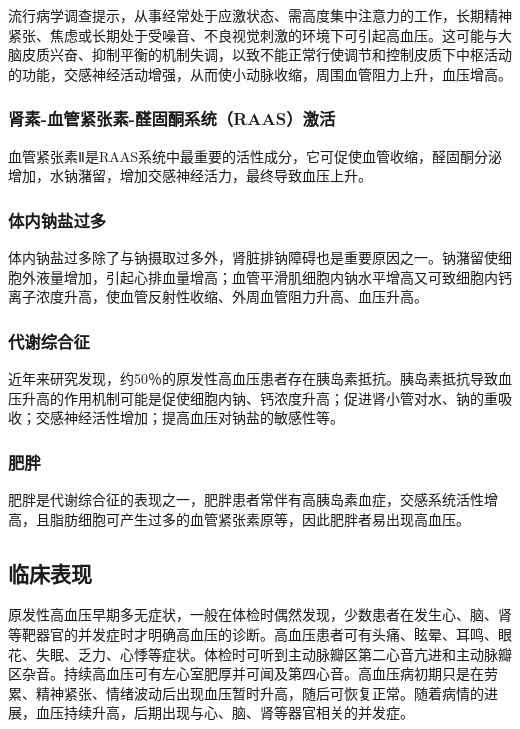 流行病学调查提示，从事经常处于应激状态、需高度集中注意力的工作，长期精神紧张、焦虑或长期处于受噪音、不良视觉刺激的环境下可引起高血压。这可能与大脑皮质兴奋、抑制平衡的机制失调，以致不能正常行使调节和控制皮质下中枢活动的功能，交感神经活动增强，从而使小动脉收缩，周围血管阻力上升，血压增高。

\subsubsection{肾素-血管紧张素-醛固酮系统（RAAS）激活}

血管紧张素Ⅱ是RAAS系统中最重要的活性成分，它可促使血管收缩，醛固酮分泌增加，水钠潴留，增加交感神经活力，最终导致血压上升。

\subsubsection{体内钠盐过多}

体内钠盐过多除了与钠摄取过多外，肾脏排钠障碍也是重要原因之一。钠潴留使细胞外液量增加，引起心排血量增高；血管平滑肌细胞内钠水平增高又可致细胞内钙离子浓度升高，使血管反射性收缩、外周血管阻力升高、血压升高。

\subsubsection{代谢综合征}

近年来研究发现，约50％的原发性高血压患者存在胰岛素抵抗。胰岛素抵抗导致血压升高的作用机制可能是促使细胞内钠、钙浓度升高；促进肾小管对水、钠的重吸收；交感神经活性增加；提高血压对钠盐的敏感性等。

\subsubsection{肥胖}

肥胖是代谢综合征的表现之一，肥胖患者常伴有高胰岛素血症，交感系统活性增高，且脂肪细胞可产生过多的血管紧张素原等，因此肥胖者易出现高血压。

\subsection{临床表现}

原发性高血压早期多无症状，一般在体检时偶然发现，少数患者在发生心、脑、肾等靶器官的并发症时才明确高血压的诊断。高血压患者可有头痛、眩晕、耳鸣、眼花、失眠、乏力、心悸等症状。体检时可听到主动脉瓣区第二心音亢进和主动脉瓣区杂音。持续高血压可有左心室肥厚并可闻及第四心音。高血压病初期只是在劳累、精神紧张、情绪波动后出现血压暂时升高，随后可恢复正常。随着病情的进展，血压持续升高，后期出现与心、脑、肾等器官相关的并发症。


